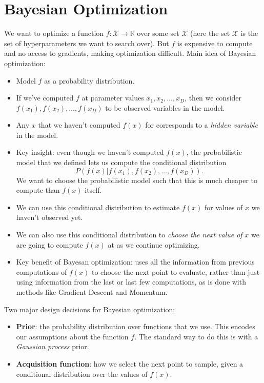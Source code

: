 \section{Bayesian Optimization}
We want to optimize a function $f : \mathcal{X} \to \mathbb{R}$ over some set $\mathcal{X}$ (here the set $\mathcal{X}$ is the set of hyperparameters we want to search over). But $f$ is expensive to compute and no access to gradients, making optimization difficult\cite{cs4787}. Main idea of Bayesian optimization:
\begin{itemize}
	\item Model $f$ as a probability distribution.
	\item If we’ve computed $f$ at parameter values $x_1, x_2, \dots , x_D$, then we consider\\ $f (x_1), f(x_2), \dots , f(x_D)$ to be observed variables in the model.
	\item Any $x$ that we haven’t computed $f(x)$ for corresponds to a \textit{hidden variable} in the model.
	\item Key insight: even though we haven’t computed $f(x)$, the probabilistic model that we defined lets us compute the conditional distribution $$ P(f(x)|f(x_1), f(x_2), \dots , f(x_D)). $$We want to choose the probabilistic model such that this is much cheaper to compute than $f(x)$ itself.
	\item We can use this conditional distribution to estimate $f(x)$ for values of $x$ we haven’t observed yet.
	\item We can also use this conditional distribution to \textit{choose the next value of} $x$ we are going to compute $f(x)$ at as we continue optimizing.
	\item Key benefit of Bayesan optimization: uses all the information from previous computations of $f(x)$ to choose the next point to evaluate, rather than just using information from the last or last few 	computations, as is done with methods like Gradient Descent and Momentum.
\end{itemize}
Two major design decisions for Bayesian optimization:
\begin{itemize}
	\item \textbf{Prior}: the probability distribution over functions that we use. This encodes our assumptions about the function $f$. The standard way to do this is with a \textit{Gaussian process} prior.
	\item \textbf{Acquisition function}: how we select the next point to sample, given a conditional distribution over the values of $f(x)$. 
\end{itemize}

